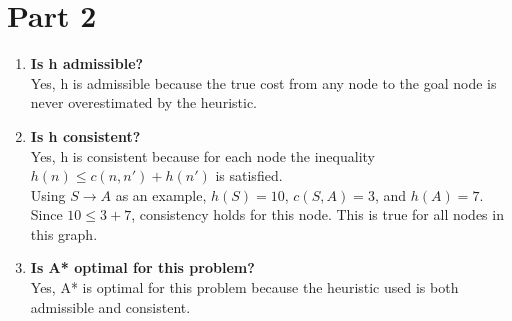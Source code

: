 \documentclass{article}
\begin{document}
\section*{Part 2}
\begin{enumerate}
    \item \textbf{Is h admissible?} \\
    Yes, h is admissible because the true cost from any node to the 
    goal node is never overestimated by the heuristic.
    \item \textbf{Is h consistent?} \\
    Yes, h is consistent because for each node the inequality
    $h(n) \leq c(n, n') + h(n')$ is satisfied. \\
    Using $S \rightarrow A$ as an example, $h(S) = 10$, $c(S, A) = 3$,
    and $h(A) = 7$. Since $10 \leq 3 + 7$, consistency holds for this 
    node. This is true for all nodes in this graph.
    \item \textbf{Is A* optimal for this problem?} \\
    Yes, A* is optimal for this problem because the heuristic used is 
    both admissible and consistent.
\end{enumerate}
\end{document}

